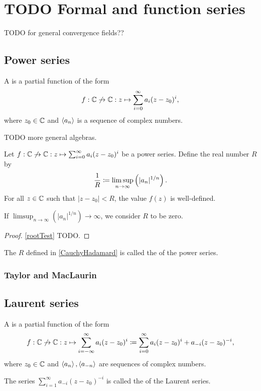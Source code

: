 \chapter{TODO Formal and function series}
TODO for general convergence fields??
\section{Power series}
\begin{definition}
A  is a partial function of the form
\[ f: \mathbb{C}\not\to \mathbb{C}: z\mapsto \sum_{i=0}^\infty a_i(z-z_0)^i, \]
where $z_0\in \mathbb{C}$ and $\left\langle a_n \right\rangle$ is a sequence of complex numbers. 
\end{definition}
TODO more general algebras.

\begin{proposition} \label{CauchyHadamard}
Let $f: \mathbb{C}\not\to \mathbb{C}: z\mapsto \sum_{i=0}^\infty a_i(z-z_0)^i$ be a power series. Define the real number $R$ by
\[ \frac{1}{R} \coloneqq \limsup_{n\to\infty}\left(|a_n|^{1/n}\right). \]
For all $z\in \mathbb{C}$ such that $|z-z_0| < R$, the value $f(z)$ is well-defined.
\end{proposition}
If $\limsup_{n\to\infty}\left(|a_n|^{1/n}\right) \to \infty$, we consider $R$ to be zero.
\begin{proof}
\ref{rootTest} TODO.
\end{proof} 

\begin{definition}
The $R$ defined in \ref{CauchyHadamard} is called the  of the power series.
\end{definition}

\subsection{Taylor and MacLaurin}
\section{Laurent series}
\begin{definition}
A  is a partial function of the form
\[ f: \mathbb{C}\not\to \mathbb{C}: z\mapsto \sum_{i=-\infty}^\infty a_i(z-z_0)^i \coloneqq \sum_{i=0}^\infty a_i(z-z_0)^i + a_{-i}(z-z_0)^{-i}, \]
where $z_0\in \mathbb{C}$ and $\left\langle a_n \right\rangle, \left\langle a_{-n} \right\rangle$ are sequences of complex numbers.

The series $\sum_{i=1}^\infty a_{-i}(z-z_0)^{-i}$ is called the  of the Laurent series.
\end{definition}

